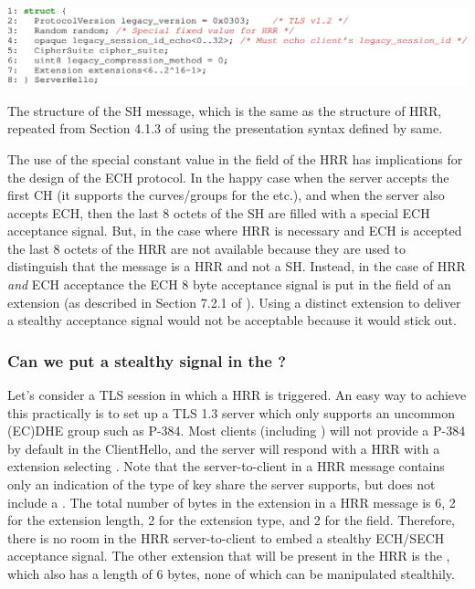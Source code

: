 \begin{listing}
    \centering
    \includegraphics[width=\linewidth]{figure/ServerHello-struct.pdf}
    \captionsetup{width=.8\linewidth} 
    \caption[\ac{SH} and \ac{HRR} Structures]{The structure of the \ac{SH} message, which is the same as the structure of \ac{HRR}, repeated from Section 4.1.3 of \cite{esni} using the presentation syntax defined by same.}
    \label{lst:server-hello-struct}
\end{listing}

The use of the special constant value in the  field of the \ac{HRR} has implications for the design of the \ac{ECH} protocol.
In the happy case when the server accepts the first \ac{CH}
(it supports the curves/groups for the  etc.),
and when the server also accepts \ac{ECH}, then the last 8 octets of the \ac{SH} are filled with a special ECH acceptance signal.
But, in the case where \ac{HRR} is necessary and \ac{ECH} is accepted
the last 8 octets of the \ac{HRR}
are not available because they are used to distinguish that the message is a \ac{HRR} and not a \ac{SH}.
Instead, in the case of \ac{HRR} {\em and} \ac{ECH} acceptance
the \ac{ECH} 8 byte acceptance signal is put in the
 field of an  extension
(as described in Section 7.2.1 of \cite{esni}).
Using a distinct extension to deliver a stealthy acceptance signal
would not be acceptable because it would stick out.

\subsubsection{Can we put a stealthy signal in the ?}

Let's consider a \ac{TLS} session in which a \ac{HRR} is triggered.
An easy way to achieve this practically is to set up a TLS 1.3 server which only supports an uncommon (\ac{EC})\ac{DHE} group such as P-384.
Most clients (including ) will not provide a P-384  by default in the ClientHello,
and the server will respond with a \ac{HRR} with a  extension selecting .
Note that the server-to-client 
in a \ac{HRR} message contains only an indication of the type of key share the server supports,
but does not include a .
The total number of bytes in the  extension in a HRR message is 6, 2 for the extension length, 2 for the extension type, and 2 for the  field. Therefore, there is no room in the HRR server-to-client  to embed a stealthy ECH/SECH acceptance signal. The other extension that will be present in the \ac{HRR} is the , which also has a length of 6 bytes, none of which can be manipulated stealthily.

